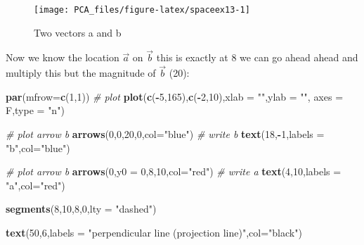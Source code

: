 \documentclass[
]{book}
\newenvironment{Shaded}{\begin{snugshade}}{\end{snugshade}}
\newcommand{\CommentTok}[1]{\textcolor[rgb]{0.56,0.35,0.01}{\textit{#1}}}
\newcommand{\DataTypeTok}[1]{\textcolor[rgb]{0.13,0.29,0.53}{#1}}
\newcommand{\DecValTok}[1]{\textcolor[rgb]{0.00,0.00,0.81}{#1}}
\newcommand{\KeywordTok}[1]{\textcolor[rgb]{0.13,0.29,0.53}{\textbf{#1}}}
\newcommand{\NormalTok}[1]{#1}
\newcommand{\OperatorTok}[1]{\textcolor[rgb]{0.81,0.36,0.00}{\textbf{#1}}}
\newcommand{\StringTok}[1]{\textcolor[rgb]{0.31,0.60,0.02}{#1}}
\theoremstyle{definition}
\theoremstyle{definition}
\theoremstyle{definition}
\theoremstyle{remark}
\begin{document}
\begin{figure}

{\centering \texttt{[image: PCA\_files/figure-latex/spaceex13-1]} 

}

\caption{Two vectors a and b}\label{fig:spaceex13}
\end{figure}

Now we know the location \(\vec{a}\) on \(\vec{b}\) this is exactly at 8 we can go ahead ahead and multiply this but the magnitude of \(\vec{b}\) (20):

\begin{Shaded}
\begin{Highlighting}[]
\KeywordTok{par}\NormalTok{(}\DataTypeTok{mfrow=}\KeywordTok{c}\NormalTok{(}\DecValTok{1}\NormalTok{,}\DecValTok{1}\NormalTok{))}
\CommentTok{# plot}
\KeywordTok{plot}\NormalTok{(}\KeywordTok{c}\NormalTok{(}\OperatorTok{-}\DecValTok{5}\NormalTok{,}\DecValTok{165}\NormalTok{),}\KeywordTok{c}\NormalTok{(}\OperatorTok{-}\DecValTok{2}\NormalTok{,}\DecValTok{10}\NormalTok{),}\DataTypeTok{xlab =} \StringTok{""}\NormalTok{,}\DataTypeTok{ylab =} \StringTok{""}\NormalTok{,}
 \DataTypeTok{axes =}\NormalTok{ F,}\DataTypeTok{type =} \StringTok{"n"}\NormalTok{)}


\CommentTok{# plot arrow b}
\KeywordTok{arrows}\NormalTok{(}\DecValTok{0}\NormalTok{,}\DecValTok{0}\NormalTok{,}\DecValTok{20}\NormalTok{,}\DecValTok{0}\NormalTok{,}\DataTypeTok{col=}\StringTok{"blue"}\NormalTok{)}
\CommentTok{# write b}
\KeywordTok{text}\NormalTok{(}\DecValTok{18}\NormalTok{,}\OperatorTok{-}\DecValTok{1}\NormalTok{,}\DataTypeTok{labels =} \StringTok{"b"}\NormalTok{,}\DataTypeTok{col=}\StringTok{"blue"}\NormalTok{)}


\CommentTok{# plot arrow b}
\KeywordTok{arrows}\NormalTok{(}\DecValTok{0}\NormalTok{,}\DataTypeTok{y0 =} \DecValTok{0}\NormalTok{,}\DecValTok{8}\NormalTok{,}\DecValTok{10}\NormalTok{,}\DataTypeTok{col=}\StringTok{"red"}\NormalTok{)}
\CommentTok{# write a}
\KeywordTok{text}\NormalTok{(}\DecValTok{4}\NormalTok{,}\DecValTok{10}\NormalTok{,}\DataTypeTok{labels =} \StringTok{"a"}\NormalTok{,}\DataTypeTok{col=}\StringTok{"red"}\NormalTok{)}

\KeywordTok{segments}\NormalTok{(}\DecValTok{8}\NormalTok{,}\DecValTok{10}\NormalTok{,}\DecValTok{8}\NormalTok{,}\DecValTok{0}\NormalTok{,}\DataTypeTok{lty =} \StringTok{"dashed"}\NormalTok{)}

\KeywordTok{text}\NormalTok{(}\DecValTok{50}\NormalTok{,}\DecValTok{6}\NormalTok{,}\DataTypeTok{labels =} \StringTok{"perpendicular line (projection line)"}\NormalTok{,}\DataTypeTok{col=}\StringTok{"black"}\NormalTok{)}


\end{Highlighting}
\end{Shaded}
\end{document}
